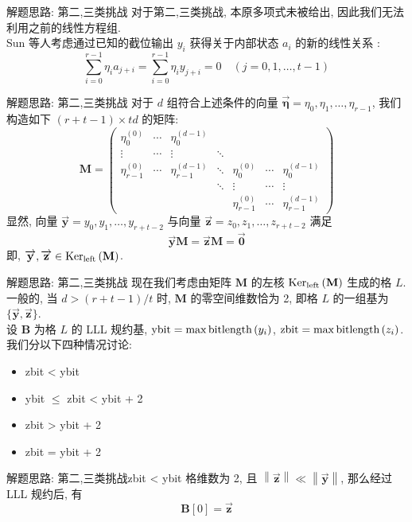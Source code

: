 \documentclass[10pt,compress]{beamer}
\newcommand{\bitlength}[1]{\ensuremath{\textnormal{bitlength}\left(#1\right)}\xspace}
\newcommand{\mat}[1]{\mathbf{#1}\xspace}
\newcommand{\leftkernel}[1]{\ensuremath{\textnormal{Ker}_{\textnormal{left}}\left(#1\right)}\xspace}
\newcommand{\norm}[1]{\left\lVert#1\right\rVert}
\renewcommand{\vec}[1]{\overrightarrow{\mathbf{#1}}\xspace}
\begin{document}
\begin{frame}{解题思路: 第二,三类挑战}
  对于第二,三类挑战, 本原多项式未被给出, 因此我们无法利用之前的线性方程组. \\
  \bigbreak
  \pause
  Sun 等人考虑通过已知的截位输出 $y_i$ 获得关于内部状态 $a_i$ 的新的线性关系 \cite[Section 3.1]{Sun2020}:
  $$
  \sum_{i=0}^{r-1} \eta_i a_{j+i} = \sum_{i=0}^{r-1} \eta_i y_{j+i} = 0 \quad\left(j=0,1,\ldots,t-1\right)
  $$
\end{frame}

\begin{frame}{解题思路: 第二,三类挑战}
  对于 $d$ 组符合上述条件的向量 $\vec{\eta} = {\eta_0, \eta_1, \ldots, \eta_{r-1}}$, 我们构造如下 $(r+t-1)\times td$ 的矩阵:
  $$
  \mat{M} =
  \begin{pmatrix}
    \eta_0^{(0)} &\cdots &\eta_0^{(d-1)} & & & & \\
    \vdots &\cdots &\vdots &\ddots & & & \\
    \eta_{r-1}^{(0)} &\cdots &\eta_{r-1}^{(d-1)} &\ddots &\eta_0^{(0)} &\cdots &\eta_0^{(d-1)} \\
     & & &\ddots &\vdots &\cdots &\vdots \\
     & & & &\eta_{r-1}^{(0)} &\cdots &\eta_{r-1}^{(d-1)}
  \end{pmatrix}
  $$
  \pause
  显然, 向量 $\vec{y} = {y_0, y_1, \ldots, y_{r+t-2}}$ 与向量 $\vec{z} = {z_0, z_1, \ldots, z_{r+t-2}}$ 满足
  $$
  \vec{y} \mat{M} = \vec{z} \mat{M} = \vec{0}
  $$
  即, $\vec{y}, \vec{z} \in \leftkernel{\mat{M}}$.
\end{frame}

\begin{frame}{解题思路: 第二,三类挑战}
  现在我们考虑由矩阵 $\mat{M}$ 的左核 $\leftkernel{\mat{M}}$ 生成的格 $L$. 一般的, 当 $d>(r+t-1)/t$ 时, $\mat{M}$ 的零空间维数恰为 2, 即格 $L$ 的一组基为 $\{\vec{y}, \vec{z}\}$. \\
  \pause
  设 $\mat{B}$ 为格 $L$ 的 LLL 规约基, $\text{ybit} = \max{\bitlength{y_i}}$, $\text{zbit} = \max{\bitlength{z_i}}$. 我们分以下四种情况讨论:
  \begin{itemize}
    \item zbit < ybit
    \item ybit $\leq$ zbit < ybit + 2
    \item zbit > ybit + 2
    \item zbit = ybit + 2
  \end{itemize}
\end{frame}

\begin{frame}{解题思路: 第二,三类挑战}{zbit < ybit}
  格维数为 2, 且 $\norm{\vec{z}} \ll \norm{\vec{y}}$, 那么经过 LLL 规约后, 有
  $$
  \mat{B}[0] = \vec{z}
  $$
\end{frame}
\end{document}
